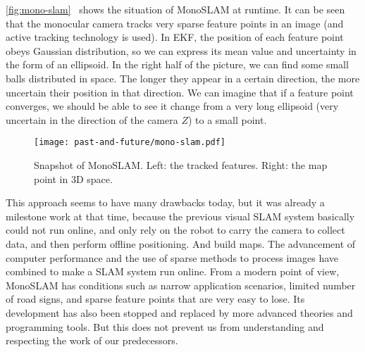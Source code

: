 \autoref{fig:mono-slam}~ shows the situation of MonoSLAM at runtime. It can be seen that the monocular camera tracks very sparse feature points in an image (and active tracking technology is used). In EKF, the position of each feature point obeys Gaussian distribution, so we can express its mean value and uncertainty in the form of an ellipsoid. In the right half of the picture, we can find some small balls distributed in space. The longer they appear in a certain direction, the more uncertain their position in that direction. We can imagine that if a feature point converges, we should be able to see it change from a very long ellipsoid (very uncertain in the direction of the camera $Z$) to a small point.

\begin{figure}[!htp]
	\centering
	\texttt{[image: past-and-future/mono-slam.pdf]}
	\caption{Snapshot of MonoSLAM. Left: the tracked features. Right: the map point in 3D space.}
	\label{fig:mono-slam}
\end{figure}

This approach seems to have many drawbacks today, but it was already a milestone work at that time, because the previous visual SLAM system basically could not run online, and only rely on the robot to carry the camera to collect data, and then perform offline positioning. And build maps. The advancement of computer performance and the use of sparse methods to process images have combined to make a SLAM system run online. From a modern point of view, MonoSLAM has conditions such as narrow application scenarios, limited number of road signs, and sparse feature points that are very easy to lose. Its development has also been stopped and replaced by more advanced theories and programming tools. But this does not prevent us from understanding and respecting the work of our predecessors.


